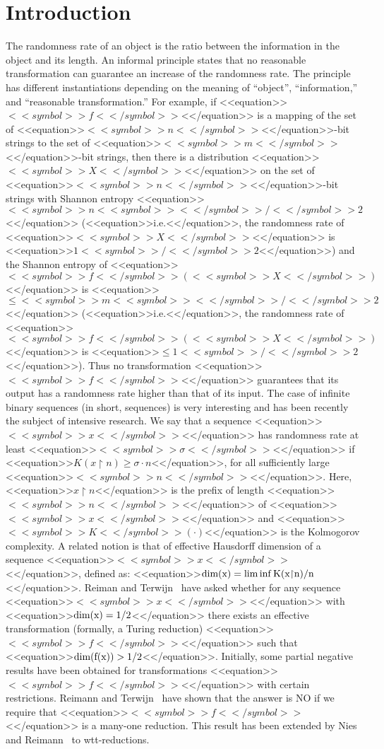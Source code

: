 \documentclass[proceedings]{stacs}
\newcommand{\ie}{<<equation>>$\mbox{i.e.}$<</equation>>}
\newcommand{\rest}{{\upharpoonright}}
\newcommand{\dimm}{\rm dim}
\begin{document}
\section{Introduction}

The randomness rate of an object is the ratio between the information in the object and its length. An informal principle states that no reasonable transformation can guarantee an increase of the randomness rate. The principle has different instantiations depending on the meaning of ``object'', ``information,'' and ``reasonable transformation.'' For example, if <<equation>>$<<symbol>>f<</symbol>>$<</equation>> is a mapping of the set of <<equation>>$<<symbol>>n<</symbol>>$<</equation>>-bit strings to the set of <<equation>>$<<symbol>>m<</symbol>>$<</equation>>-bit strings, then there is a distribution <<equation>>$<<symbol>>X<</symbol>>$<</equation>> on the set of <<equation>>$<<symbol>>n<</symbol>>$<</equation>>-bit strings with Shannon entropy <<equation>>$<<symbol>>n<<symbol>><</symbol>>/<</symbol>>2$<</equation>> (\ie,  the randomness rate of <<equation>>$<<symbol>>X<</symbol>>$<</equation>> is <<equation>>$1<<symbol>>/<</symbol>>2$<</equation>>) and the Shannon entropy of <<equation>>$<<symbol>>f<</symbol>>(<<symbol>>X<</symbol>>)$<</equation>> is <<equation>>$\leq <<symbol>>m<<symbol>><</symbol>>/<</symbol>>2$<</equation>> (\ie, the randomness rate of <<equation>>$<<symbol>>f<</symbol>>(<<symbol>>X<</symbol>>)$<</equation>> is <<equation>>$\leq 1<<symbol>>/<</symbol>>2$<</equation>>). Thus no transformation <<equation>>$<<symbol>>f<</symbol>>$<</equation>> guarantees that its output has a randomness rate higher than that of its input. The case of infinite binary sequences (in short, sequences) is very interesting and has been recently the subject of intensive research. We say that a sequence <<equation>>$<<symbol>>x<</symbol>>$<</equation>> has randomness rate at least <<equation>>$<<symbol>>\sigma<</symbol>>$<</equation>> if <<equation>>$K(x \rest n) \geq \sigma \cdot n$<</equation>>, for all sufficiently large <<equation>>$<<symbol>>n<</symbol>>$<</equation>>. Here, <<equation>>$x \rest n$<</equation>> is the prefix of length <<equation>>$<<symbol>>n<</symbol>>$<</equation>> of <<equation>>$<<symbol>>x<</symbol>>$<</equation>> and <<equation>>$<<symbol>>K<</symbol>>(\cdot)$<</equation>> is the Kolmogorov complexity. A related notion is that of effective Hausdorff dimension of a sequence <<equation>>$<<symbol>>x<</symbol>>$<</equation>>, defined as: <<equation>>$\dimm(x) = \lim \inf K(x \rest n)/n$<</equation>>. Reiman and Terwijn~\cite{rei:t:thesis} have asked whether for any sequence <<equation>>$<<symbol>>x<</symbol>>$<</equation>> with <<equation>>$\dimm(x) = 1/2$<</equation>> there exists an effective transformation (formally, a Turing reduction) <<equation>>$<<symbol>>f<</symbol>>$<</equation>> such that <<equation>>$\dimm(f(x)) > 1/2$<</equation>>. Initially, some partial negative results have been obtained for transformations <<equation>>$<<symbol>>f<</symbol>>$<</equation>> with certain restrictions.  Reimann and Terwijn~\cite[Th 3.10]{rei:t:thesis}   have shown that the answer is NO if we require that <<equation>>$<<symbol>>f<</symbol>>$<</equation>> is a many-one reduction.  This result has been extended by Nies and Reimann~\cite{nie-rei:c:wtt-Kolm-increase} to wtt-reductions.
\end{document}
